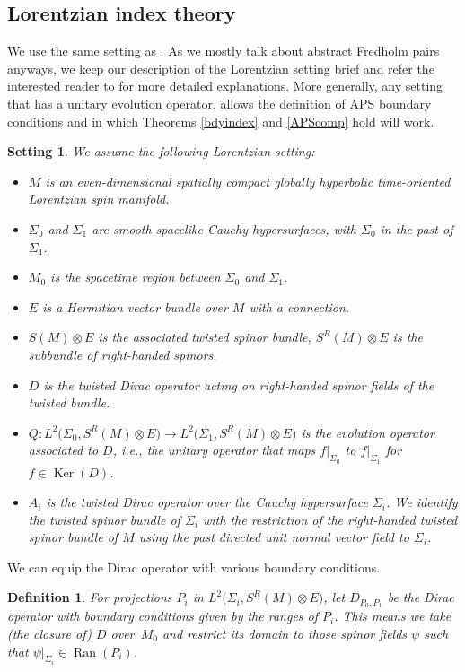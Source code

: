 \documentclass[pdftex]{sigma}
\numberwithin{equation}{section}
\newtheorem{Setting}[Theorem]{Setting}
\newtheorem{Definition}[Theorem]{Definition}
\DeclareMathOperator{\Ran}{Ran}
\DeclareMathOperator{\Ker}{Ker}
\begin{document}
	\subsection{Lorentzian index theory}
	\label{Lorentzintro}
	We use the same setting as \cite{BH}. As we mostly talk about abstract Fredholm pairs anyways, we keep our description of the Lorentzian setting brief and refer the interested reader to \cite[Section~2]{BH} for more detailed explanations. More generally, any setting that has a unitary evolution operator, allows the definition of APS boundary conditions and  in which Theorems \ref{bdyindex} and \ref{APScomp} hold will work.

	\begin{Setting}
We assume the following Lorentzian setting:
	\begin{itemize}\itemsep=0pt
            \item $M$ is an even-dimensional spatially compact globally hyperbolic time-oriented Lorentzian spin manifold.
			\item $\Sigma_0$ and $\Sigma_1$ are smooth spacelike Cauchy hypersurfaces, with $\Sigma_0$ in the past of $\Sigma_1$.
			\item $M_0$ is the spacetime region between $\Sigma_0$ and $\Sigma_1$.
			\item $E$ is a Hermitian vector bundle over $M$ with a connection.
			\item $S(M)\otimes E$ is the associated twisted spinor bundle, $S^R(M)\otimes E$ is the subbundle of right-handed spinors.
			\item $D$ is the twisted Dirac operator acting on right-handed spinor fields of the twisted bundle.
			\item $Q\colon L^2\bigl(\Sigma_0,S^R(M)\otimes E\bigr)\rightarrow L^2\bigl(\Sigma_1,S^R(M)\otimes E\bigr)$ is the evolution operator associated to $D$, i.e., the unitary operator that maps $f|_{\Sigma_0}$ to $f|_{\Sigma_1}$ for $f\in\Ker(D)$.
			\item $A_i$ is the twisted Dirac operator over the Cauchy hypersurface $\Sigma_i$. We identify the twisted spinor bundle of $\Sigma_i$ with the restriction of the right-handed twisted spinor bundle of $M$ using the past directed unit normal vector field to $\Sigma_i$.
		\end{itemize}
	\end{Setting}
	We can equip the Dirac operator with various boundary conditions.
	\begin{Definition}
		For projections $P_i$ in $L^2\bigl(\Sigma_i,S^R(M)\otimes E\bigr)$, let $D_{P_0,P_1}$ be the Dirac operator with boundary conditions given by the ranges of $P_i$. This means we take (the closure of) $D$ over~$M_0$ and restrict its domain to those spinor fields $\psi$ such that $\psi|_{\Sigma_i}\in \Ran(P_i)$.
	\end{Definition}
\end{document}
